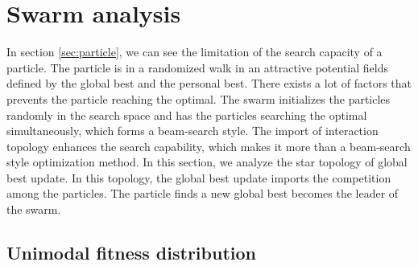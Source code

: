 \section{Swarm analysis}
\label{sec:swarm}




In section \ref{sec:particle}, we can see the limitation of the search capacity of a particle.
The particle is in a randomized walk in an attractive potential fields defined by the global best and the personal best.
There exists a lot of factors that prevents the particle reaching the optimal.
The swarm initializes the particles randomly in the search space and has the particles searching the optimal simultaneously, which forms a beam-search style.
The import of interaction topology enhances the search capability, which makes it more than a beam-search style optimization method.
In this section, we analyze the star topology of global best update.
In this topology, the global best update imports the competition among the particles.
The particle finds a new global best becomes the leader of the swarm.

\subsection{Unimodal fitness distribution}


